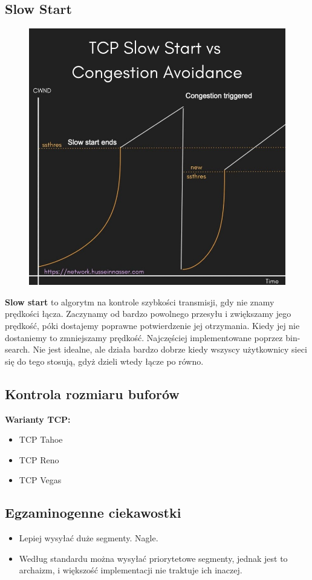 \documentclass[]{article}
\begin{document}
\subsection{Slow Start}
\begin{figure}
\includegraphics[width=\linewidth]{slow-start.jpg} 
\end{figure}
\textbf{Slow start} to algorytm na kontrole szybkości transmisji, gdy nie znamy prędkości łącza. Zaczynamy od bardzo powolnego przesyłu i zwiększamy jego prędkość, póki dostajemy poprawne potwierdzenie jej otrzymania. Kiedy jej nie dostaniemy to zmniejszamy prędkość. Najczęściej implementowane poprzez bin-search. Nie jest idealne, ale działa bardzo dobrze kiedy wszyscy użytkownicy sieci się do tego stosują, gdyż dzieli wtedy łącze po równo.\\
\subsection{Kontrola rozmiaru buforów}
\textbf{Warianty TCP:}
\begin{itemize}
    \item TCP Tahoe
    \item TCP Reno
    \item TCP Vegas
\end{itemize}
\subsection{Egzaminogenne ciekawostki}
\begin{itemize}
    \item Lepiej wysyłać duże segmenty. Nagle.
    \item Według standardu można wysyłać priorytetowe segmenty, jednak jest to archaizm, i większość implementacji nie traktuje ich inaczej.
\end{itemize}
\end{document}
